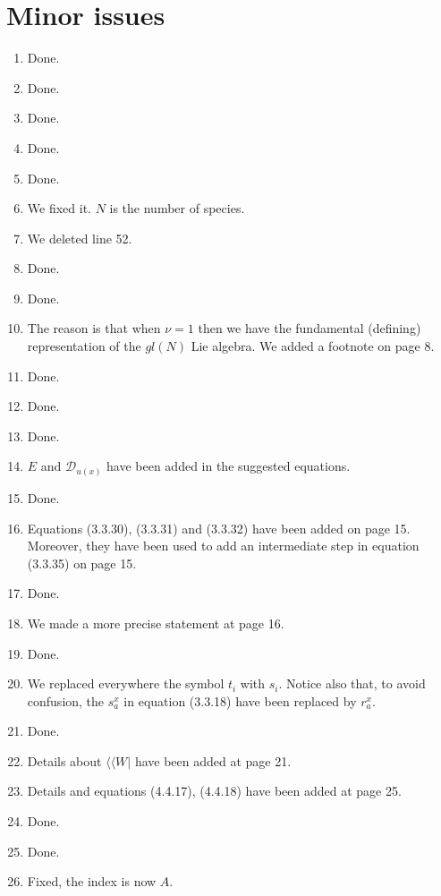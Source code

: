 \documentclass[10pt]{article}
\numberwithin{equation}{section}
\numberwithin{equation}{subsection}
\begin{document}
		\section*{Minor issues}
		\begin{enumerate}
			\item Done.
			\item Done.
			\item Done.
			\item Done.
			\item Done.
			\item We fixed it. $N$ is the number of species. 
			\item We deleted line 52.
			\item Done.
			\item Done.
			\item The reason is that when $\nu=1$ then we have the fundamental (defining) representation of the $gl(N)$ Lie algebra. We added a footnote on page 8. %
			\item Done.
			\item Done.
			\item Done.
			\item  $E$ and $\mathcal{D}_{u(x)}$ have been added in the suggested equations.
			\item Done.
			\item Equations (3.3.30), (3.3.31) and (3.3.32) have been added on page 15. Moreover, they have been used to add an intermediate step in equation (3.3.35) on page 15.
			\item Done.
			\item We made a more precise statement at page 16. 
			\item Done.
			\item We replaced everywhere the symbol $t_{i}$ with $s_{i}$. Notice also that, to avoid confusion, the $s_{a}^{x}$ in equation (3.3.18) have been replaced by $r_{a}^{x}$.
			\item Done. 
			\item Details about $\langle \langle W|$ have been added at page 21. 
			\item Details and equations (4.4.17), (4.4.18) have been added at page 25. 
			\item Done.
			\item Done.
			\item Fixed, the index is now $A$.

\end{enumerate}
\end{document}
